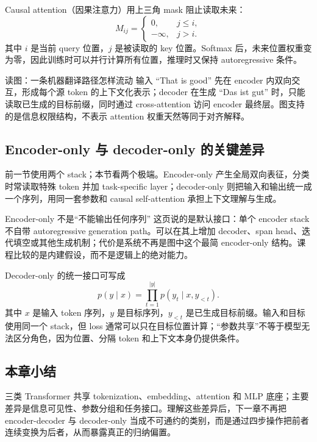 Causal attention（因果注意力）用上三角 mask 阻止读取未来：
\[
M_{ij}=\begin{cases}
0,&j\le i,\\
-\infty,&j>i.
\end{cases}
\]
其中 $i$ 是当前 query 位置，$j$ 是被读取的 key 位置。Softmax 后，未来位置权重变为零，因此训练时可以并行计算所有位置，推理时又保持 autoregressive 条件。



\begin{knowledgebox}{读图：一条机器翻译路径怎样流动}
输入 ``That is good'' 先在 encoder 内双向交互，形成每个源 token 的上下文化表示；decoder 在生成 ``Das ist gut'' 时，只能读取已生成的目标前缀，同时通过 cross-attention 访问 encoder 最终层。图支持的是信息权限结构，不表示 attention 权重天然等同于对齐解释。
\end{knowledgebox}

\subsection{Encoder-only 与 decoder-only 的关键差异}

前一节使用两个 stack；本节看两个极端。Encoder-only 产生全局双向表征，分类时常读取特殊 token 并加 task-specific layer；decoder-only 则把输入和输出统一成一个序列，用同一套参数和 causal self-attention 承担上下文理解与生成。


\begin{warningbox}{Encoder-only 不是“不能输出任何序列”}
这页说的是默认接口：单个 encoder stack 不自带 autoregressive generation path。可以在其上增加 decoder、span head、迭代填空或其他生成机制；代价是系统不再是图中这个最简 encoder-only 结构。课程比较的是内建假设，而不是逻辑上的绝对能力。
\end{warningbox}


Decoder-only 的统一接口可写成
\[
p(y\mid x)=\prod_{t=1}^{|y|}p(y_t\mid x,y_{<t}).
\]
其中 $x$ 是输入 token 序列，$y$ 是目标序列，$y_{<t}$ 是已生成目标前缀。输入和目标使用同一个 stack，但 loss 通常可以只在目标位置计算；“参数共享”不等于模型无法区分角色，因为位置、分隔 token 和上下文本身仍提供条件。

\subsection{本章小结}

三类 Transformer 共享 tokenization、embedding、attention 和 MLP 底座；主要差异是信息可见性、参数分组和任务接口。理解这些差异后，下一章不再把 encoder-decoder 与 decoder-only 当成不可通约的类别，而是通过四步操作把前者连续变换为后者，从而暴露真正的归纳偏置。

